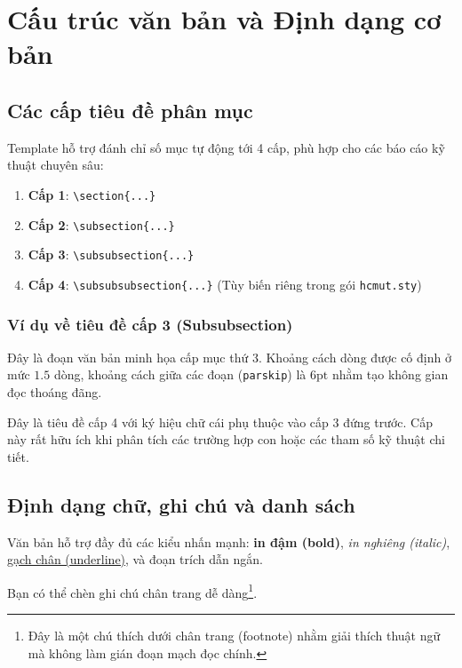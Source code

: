 \section{Cấu trúc văn bản và Định dạng cơ bản}
\label{sec:structure}

\subsection{Các cấp tiêu đề phân mục}
Template hỗ trợ đánh chỉ số mục tự động tới 4 cấp, phù hợp cho các báo cáo kỹ thuật chuyên sâu:
\begin{enumerate}
    \item \textbf{Cấp 1}: \texttt{\textbackslash section\{...\}}
    \item \textbf{Cấp 2}: \texttt{\textbackslash subsection\{...\}}
    \item \textbf{Cấp 3}: \texttt{\textbackslash subsubsection\{...\}}
    \item \textbf{Cấp 4}: \texttt{\textbackslash subsubsubsection\{...\}} (Tùy biến riêng trong gói \texttt{hcmut.sty})
\end{enumerate}

\subsubsection{Ví dụ về tiêu đề cấp 3 (Subsubsection)}
Đây là đoạn văn bản minh họa cấp mục thứ 3. Khoảng cách dòng được cố định ở mức $1.5$ dòng, khoảng cách giữa các đoạn (\texttt{parskip}) là $6\text{pt}$ nhằm tạo không gian đọc thoáng đãng.

Đây là tiêu đề cấp 4 với ký hiệu chữ cái phụ thuộc vào cấp 3 đứng trước. Cấp này rất hữu ích khi phân tích các trường hợp con hoặc các tham số kỹ thuật chi tiết.

\subsection{Định dạng chữ, ghi chú và danh sách}
Văn bản hỗ trợ đầy đủ các kiểu nhấn mạnh: \textbf{in đậm (bold)}, \textit{in nghiêng (italic)}, \underline{gạch chân (underline)}, và đoạn trích dẫn ngắn.

Bạn có thể chèn ghi chú chân trang dễ dàng\footnote{Đây là một chú thích dưới chân trang (footnote) nhằm giải thích thuật ngữ mà không làm gián đoạn mạch đọc chính.}.


